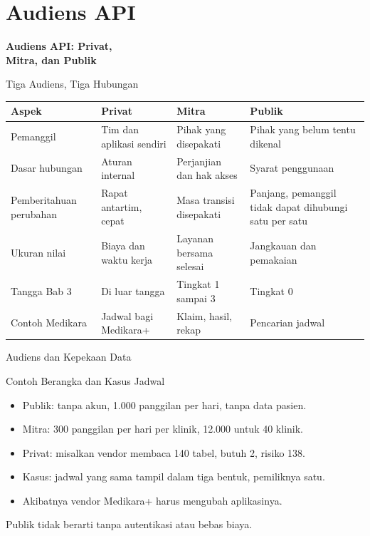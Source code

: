 \documentclass[aspectratio=169, table, 12pt]{beamer}
\begin{document}
\section{Audiens API}

\begin{frame}{\hfill}
  \centering
  \Huge{\textbf{Audiens API: Privat,\\Mitra, dan Publik}}
\end{frame}

\begin{frame}{{\Large Tiga Audiens, Tiga Hubungan}}
  \footnotesize
  \begin{tabularx}{\textwidth}{>{\raggedright\arraybackslash}p{2.9cm}
      >{\raggedright\arraybackslash}X >{\raggedright\arraybackslash}X >{\raggedright\arraybackslash}X}
    \hline
    \textbf{Aspek} & \textbf{Privat} & \textbf{Mitra} & \textbf{Publik} \\ \hline
    Pemanggil & Tim dan aplikasi sendiri & Pihak yang disepakati & Pihak yang belum tentu dikenal \\ \hline
    Dasar hubungan & Aturan internal & Perjanjian dan hak akses & Syarat penggunaan \\ \hline
    Pemberitahuan perubahan & Rapat antartim, cepat & Masa transisi disepakati & Panjang, pemanggil tidak dapat dihubungi satu per satu \\ \hline
    Ukuran nilai & Biaya dan waktu kerja & Layanan bersama selesai & Jangkauan dan pemakaian \\ \hline
    Tangga Bab 3 & Di luar tangga & Tingkat 1 sampai 3 & Tingkat 0 \\ \hline
    Contoh Medikara & Jadwal bagi Medikara+ & Klaim, hasil, rekap & Pencarian jadwal \\ \hline
  \end{tabularx}
\end{frame}

\begin{frame}{{\Large Audiens dan Kepekaan Data}}
  \centering
\end{frame}

\begin{frame}{{\Large Contoh Berangka dan Kasus Jadwal}}
  \vspace{10pt}
  \begin{itemize}
    \item Publik: tanpa akun, 1.000 panggilan per hari, tanpa data pasien.
    \item Mitra: 300 panggilan per hari per klinik, 12.000 untuk 40 klinik.
    \item Privat: misalkan vendor membaca 140 tabel, butuh 2, risiko 138.
    \item Kasus: jadwal yang sama tampil dalam tiga bentuk, pemiliknya satu.
    \item Akibatnya vendor Medikara+ harus mengubah aplikasinya.
  \end{itemize}
  \vspace{6pt}
  {\small Publik tidak berarti tanpa autentikasi atau bebas biaya.}
\end{frame}
\end{document}
